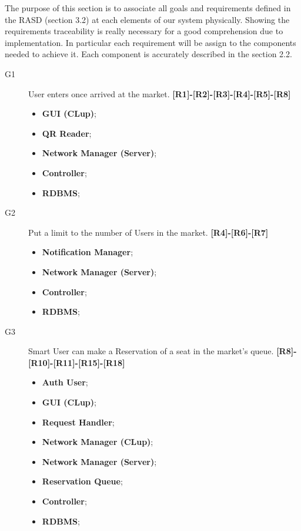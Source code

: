 The purpose of this section is to associate all goals and requirements defined in the RASD (section 3.2) at each elements of our system physically.
Showing the requirements traceability is really necessary for a good comprehension due to implementation.
In particular each requirement will be assign to the components needed to achieve it. 
Each component is accurately described in the section 2.2.


\begin{description}
    \item[G1]User enters once arrived at the market. \textbf{[R1]-[R2]-[R3]-[R4]-[R5]-[R8]}
    
    \begin{itemize}
        \item \textbf{GUI (CLup)}; 
        \item \textbf{QR Reader};  
        \item \textbf{Network Manager (Server)};  
        \item \textbf{Controller};
        \item \textbf{RDBMS};
    \end{itemize}
    
    \item[G2]Put a limit to the number of Users in the market. \textbf{[R4]-[R6]-[R7]}
    
    \begin{itemize}
        
        \item \textbf{Notification Manager};  
        \item \textbf{Network Manager (Server)};  
        \item \textbf{Controller};
        \item \textbf{RDBMS};
    \end{itemize}
    
        \item[G3]Smart User can make a Reservation of a seat in the market's queue. \textbf{[R8]-[R10]-[R11]-[R15]-[R18]}
    \begin{itemize}
        \item \textbf{Auth User};  
        \item \textbf{GUI (CLup)};  
        \item \textbf{Request Handler}; 
        \item \textbf{Network Manager (CLup)}; 
        \item \textbf{Network Manager (Server)};  
        \item \textbf{Reservation Queue};  
        \item \textbf{Controller};
        \item \textbf{RDBMS};
    \end{itemize}
        

\end{description}
